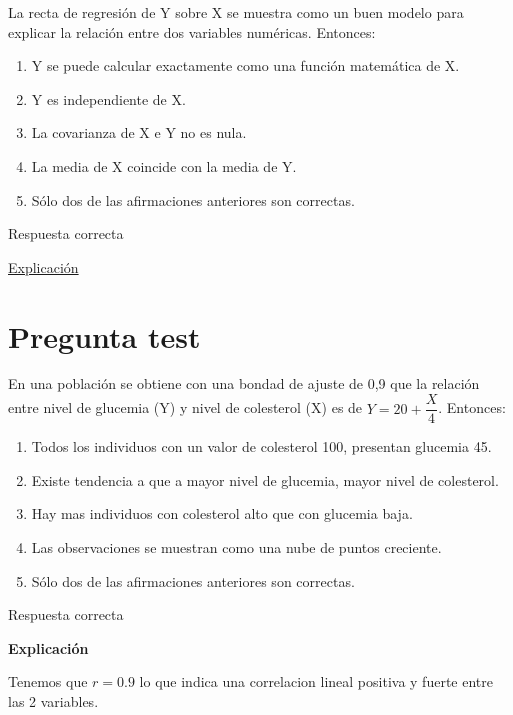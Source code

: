 \documentclass[
]{book}
\providecommand{\tightlist}{%
  \setlength{\itemsep}{0pt}\setlength{\parskip}{0pt}}
\begin{document}
La recta de regresión de Y sobre X se muestra como un buen modelo para explicar la relación entre dos variables numéricas. Entonces:

\begin{enumerate}
\def\labelenumi{\alph{enumi})}
\tightlist
\item
  Y se puede calcular exactamente como una función matemática de X.
\item
  Y es independiente de X.
\item
  La covarianza de X e Y no es nula.
\item
  La media de X coincide con la media de Y.
\item
  Sólo dos de las afirmaciones anteriores son correctas.
\end{enumerate}

Respuesta correcta

\href{https://1fjmanzano.github.io/bioestadistica/relaci\%C3\%B3n-entre-variables-nume\%CC\%81ricas.html\#covarianza}{Explicación}

\hypertarget{pregunta-test-112}{%
\section{Pregunta test}\label{pregunta-test-112}}

En una población se obtiene con una bondad de ajuste de 0,9 que la relación entre nivel de glucemia (Y) y nivel de colesterol (X) es de \(Y=20 + \dfrac{X}{4}\). Entonces:

\begin{enumerate}
\def\labelenumi{\alph{enumi})}
\tightlist
\item
  Todos los individuos con un valor de colesterol 100, presentan glucemia 45.
\item
  Existe tendencia a que a mayor nivel de glucemia, mayor nivel de colesterol.
\item
  Hay mas individuos con colesterol alto que con glucemia baja.
\item
  Las observaciones se muestran como una nube de puntos creciente.
\item
  Sólo dos de las afirmaciones anteriores son correctas.
\end{enumerate}

Respuesta correcta

\textbf{Explicación}

Tenemos que \(r = 0.9\) lo que indica una correlacion lineal positiva y fuerte entre las 2 variables.
\end{document}
